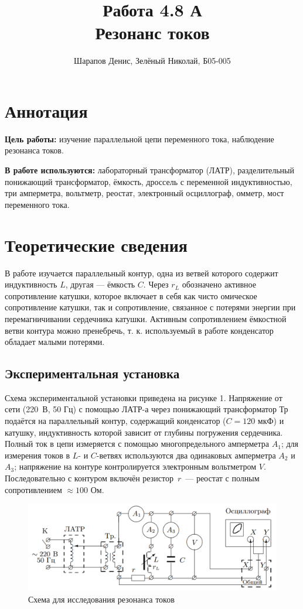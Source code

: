 \documentclass[a4paper]{article}
\title{Работа 4.8 А \\ Резонанс токов}
\author{Шарапов Денис, Зелёный Николай, Б05-005}
\date{}
\theoremstyle{definition}
\theoremstyle{remark}
\begin{document}
    \maketitle
    \tableofcontents
    \newpage
    
\section{Аннотация}

\textbf{Цель работы:} изучение параллельной цепи переменного тока, наблюдение резонанса токов. \medskip
 
\noindent \textbf{В работе используются:} лабораторный трансформатор (ЛАТР), разделительный понижающий трансформатор, ёмкость, дроссель с переменной индуктивностью, три амперметра, вольтметр, реостат, электронный осциллограф, омметр, мост переменного тока.
 
\section{Теоретические сведения}

В работе изучается параллельный контур, одна из ветвей которого содержит индуктивность $L$, другая --- ёмкость $C$. Через $r_L$ обозначено активное сопротивление катушки, которое включает в себя как чисто омическое сопротивление катушки, так и сопротивление, связанное с потерями энергии при перемагничивании сердечника катушки. Активным сопротивлением ёмкостной ветви контура можно пренебречь, т. к. используемый в работе конденсатор обладает малыми потерями.

\subsection*{Экспериментальная установка}

Схема экспериментальной установки приведена на рисунке 1. Напряжение от сети (220~В, 50 Гц) с помощью ЛАТР-а через понижающий трансформатор Тр подаётся на параллельный контур, содержащий конденсатор ($C = 120$ мкФ) и катушку, индуктивность которой зависит от глубины погружения сердечника. Полный ток в цепи измеряется с помощью многопредельного амперметра $A_1$; для измерения токов в $L$- и $C$-ветвях используются два одинаковых амперметра $A_2$ и $A_3$; напряжение на контуре контролируется электронным вольтметром $V$. Последовательно с контуром включён резистор~$r$~--- реостат с полным сопротивлением $\approx 100$ Ом.

\begin{figure}[h!]
    \centering
    \includegraphics[width = 325pt]{image/picture1.png}
    \caption{Схема для исследования резонанса токов}
\end{figure}
\end{document}
